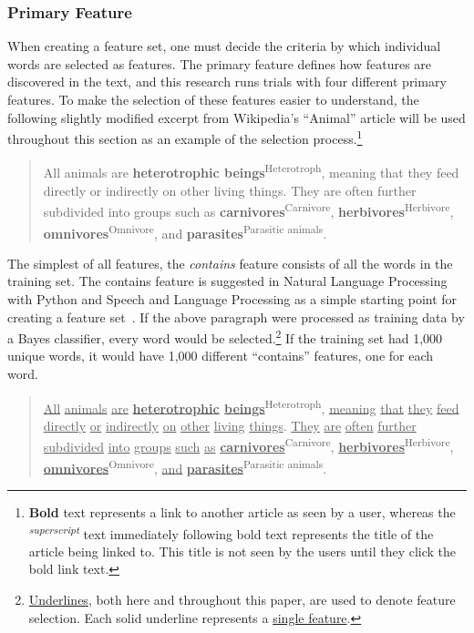 \subsubsection{Primary Feature}

When creating a feature set, one must decide the criteria by which individual words are selected as features.
The primary feature defines how features are discovered in the text, and this research runs trials with four different primary features.
To make the selection of these features easier to understand, the following slightly modified excerpt from Wikipedia's ``Animal'' article will be used throughout this section as an example of the selection process.\footnote{{\bf Bold} text represents a link to another article as seen by a user, whereas the \textsuperscript{\it superscript} text immediately following bold text represents the title of the article being linked to. This title is not seen by the users until they click the bold link text.}

\begin{quote}
All animals are {\bf heterotrophic beings}\textsuperscript{Heterotroph}, meaning that they feed directly or indirectly on other living things. They are often further subdivided into groups such as {\bf carnivores}\textsuperscript{Carnivore}, {\bf herbivores}\textsuperscript{Herbivore}, {\bf omnivores}\textsuperscript{Omnivore}, and {\bf parasites}\textsuperscript{Parasitic animals}.
\end{quote}


The simplest of all features, the {\it contains} feature consists of all the words in the training set.
The contains feature is suggested in Natural Language Processing with Python and Speech and Language Processing as a simple starting point for creating a feature set~\cite{nlpwp,jurafsky}.
If the above paragraph were processed as training data by a \naive Bayes classifier, every word would be selected.\footnote{\underline{Underlines}, both here and throughout this paper, are used to denote feature selection. Each solid underline represents a \underline{single feature}.}
If the training set had 1,000 unique words, it would have 1,000 different ``contains'' features, one for each word.

\begin{quote}
\underline{All} \underline{animals} \underline{are} {\bf \underline{heterotrophic} \underline{beings}}\textsuperscript{Heterotroph}, \underline{meaning} \underline{that} \underline{they} \underline{feed} \underline{directly} \underline{or} \underline{indirectly} \underline{on} \underline{other} \underline{living} \underline{things}. \underline{They} \underline{are} \underline{often} \underline{further} \underline{subdivided} \underline{into} \underline{groups} \underline{such} \underline{as} \underline{\bf carnivores}\textsuperscript{Carnivore}, \underline{\bf herbivores}\textsuperscript{Herbivore}, \underline{\bf omnivores}\textsuperscript{Omnivore}, \underline{and} \underline{\bf parasites}\textsuperscript{Parasitic animals}.
\end{quote}

